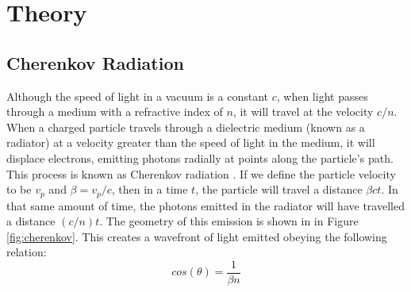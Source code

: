 
\chapter{Theory}
\label{ch:Theory}

\section{Cherenkov Radiation}
\label{sec:cherenkov}
Although the speed of light in a vacuum is a constant $c$, when light passes through a medium with a refractive index of $n$, it will travel at the velocity $c/n$.
When a charged particle travels through a dielectric medium (known as a radiator) at a velocity greater than the speed of light in the medium, it will displace electrons, emitting photons radially at points along the particle's path.
This process is known as Cherenkov radiation \cite{cherenkov}.
If we define the particle velocity to be $v_p$ and $\beta = v_p / c$, then in a time $t$, the particle will travel a distance $\beta ct$.
In that same amount of time, the photons emitted in the radiator will have travelled a distance $(c/n)t$.
The geometry of this emission is shown in in Figure \ref{fig:cherenkov}.
This creates a wavefront of light emitted obeying the following relation:
\begin{equation}
    cos(\theta) = \frac{1}{\beta n}
    \label{eq:cherenkovAngle}
\end{equation}

